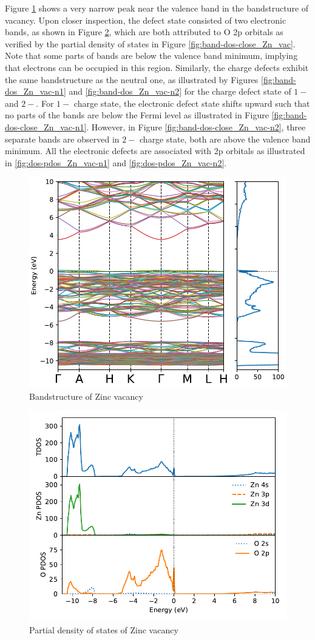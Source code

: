 Figure \ref{fig:band-dos_Zn_vac} shows a very narrow peak near the valence band in the bandstructure of  vacancy. Upon closer inspection, the defect state consisted of two electronic bands, as shown in Figure \ref{fig:dos-pdos_Zn_vac}, which are both attributed to O 2p orbitals as verified by the partial density of states in Figure \ref{fig:band-dos-close_Zn_vac}. Note that some parts of bands are below the valence band minimum, implying that electrons can be occupied in this region. Similarly, the charge defects exhibit the same bandstructure as the neutral one, as illustrated by Figures \ref{fig:band-dos_Zn_vac-n1} and \ref{fig:band-dos_Zn_vac-n2} for the charge defect state of $1-$ and $2-$.  For $1-$ charge state, the electronic defect state shifts upward such that no parts of the bands are below the Fermi level as illustrated in Figure \ref{fig:band-dos-close_Zn_vac-n1}. However, in Figure \ref{fig:band-dos-close_Zn_vac-n2}, three separate bands are observed in $2-$ charge state, both are above the valence band minimum. All the electronic defects are associated with 2p orbitals as illustrated in \ref{fig:dos-pdos_Zn_vac-n1} and \ref{fig:dos-pdos_Zn_vac-n2}.


\begin{figure}[tbh!]
	\centering
	\includegraphics[width=0.6\linewidth]{"images/rnd/band-dos_Zn_vac"}
	\caption[Bandstructure of Zinc vacancy]{Bandstructure of Zinc vacancy}
	\label{fig:band-dos_Zn_vac}
\end{figure}

\begin{figure}[tbh!]
	\centering
	\includegraphics[width=0.6\linewidth]{"images/rnd/dos-pdos_Zn_vac"}
	\caption[Partial density of states of Zinc vacancy]{Partial density of states of Zinc vacancy}
	\label{fig:dos-pdos_Zn_vac}
\end{figure}


